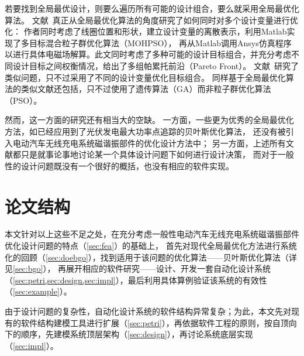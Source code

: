 \documentclass[index]{subfiles}
\begin{document}
若要找到全局最优设计，则要么遍历所有可能的设计组合，要么就采用全局最优化算法。
文献~真正从全局最优化算法的角度研究了如何同时对多个设计变量进行优化：
作者同时考虑了线圈位置和形状，建立设计变量的离散表示，利用Matlab实现了多目标混合粒子群优化算法（MOHPSO），
再从Matlab调用Ansys仿真程序以进行具体电磁场解算。此文同时考虑了多种可能的设计目标组合，并充分考虑不同设计目标之间权衡情况，给出了多组帕累托前沿（Pareto Front）。
文献~研究了类似问题，只不过采用了不同的设计变量优化目标组合。
同样基于全局最优化算法的类似文献还包括，只不过使用了遗传算法（GA）而非粒子群优化算法（PSO）。

然而，这一方面的研究还有相当大的空缺。
一方面，一些更为优秀的全局最优化方法，如已经应用到了光伏发电最大功率点追踪\cite{abdelrahman2016}的贝叶斯优化算法，
还没有被引入电动汽车无线充电系统磁谐振部件的优化设计方法中；
另一方面，上述所有文献都只是就事论事地讨论某一个具体设计问题下如何进行设计决策，
而对于一般性的设计问题既没有一个很好的概括，也没有相应的软件实现。

\section{论文结构}
本文针对以上这些不足之处，在充分考虑一般性电动汽车无线充电系统磁谐振部件优化设计问题的特点（\cref{sec:fea}）的基础上，
首先对现代全局最优化方法进行系统化的回顾（\cref{sec:doebgo}），找到适用于该问题的优化算法——贝叶斯优化算法（详见\cref{sec:bgo}），
再展开相应的软件研究——设计、开发一套自动化设计系统（\cref{sec:petri,sec:design,sec:impl}），最后利用具体算例验证该系统的有效性（\cref{sec:example}）。

由于设计问题的复杂性，自动化设计系统的软件结构异常复杂；为此，本文先对现有的软件结构建模工具进行扩展（\cref{sec:petri}），再依据软件工程的原则，按自顶向下的顺序，先建模系统顶层架构（\cref{sec:design}），再讨论系统底层实现（\cref{sec:impl}）。
\end{document}
